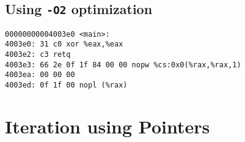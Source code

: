 \documentclass{article}
\begin{document}
 \subsection*{Using \texttt{-O2} optimization}
 \texttt{00000000004003e0 <main>:}
 \\\texttt{4003e0:	31 c0                	xor    \%eax,\%eax}
  \\\texttt{4003e2:	c3                   	retq   }
  \\\texttt{4003e3:	66 2e 0f 1f 84 00 00 	nopw   \%cs:0x0(\%rax,\%rax,1)}
  \\\texttt{4003ea:	00 00 00 }
  \\\texttt{4003ed:	0f 1f 00             	nopl   (\%rax)}

 
\pagebreak

 \section*{Iteration using Pointers}
\end{document}
